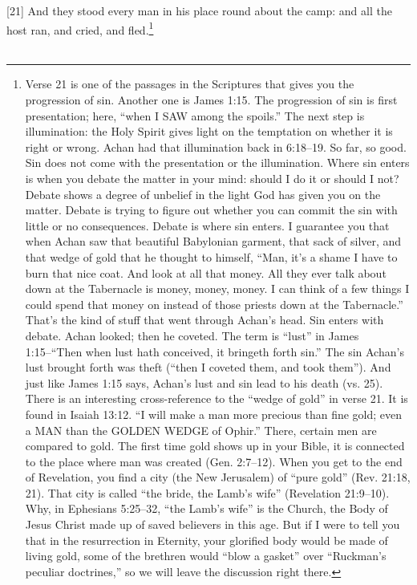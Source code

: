 {[21] \textcolor[rgb]{0.00,0.00,1.00}{And they stood every man in his place round about the camp: and all the host ran, and cried, and fled.}\footnote{Verse 21 is one of the passages in the Scriptures that gives you the progression of sin. Another one is James 1:15. The progression of sin is first presentation; here, “when I SAW among the spoils.” The next step is illumination: the Holy Spirit gives light on the temptation on whether it is right or wrong. Achan had that illumination back in 6:18--19. So far, so good. Sin does not come with the presentation or the illumination. Where sin enters is when you debate the matter in your mind: should I do it or should I not? Debate shows a degree of unbelief in the light God has given you on the matter. Debate is trying to figure out whether you can commit the sin with little or no consequences. Debate is where sin enters. I guarantee you that when Achan saw that beautiful Babylonian garment, that sack of silver, and that wedge of gold that he thought to himself, ``Man, it’s a shame I have to burn that nice coat. And look at all that money. All they ever talk about down at the Tabernacle is money, money, money. I can think of a few things I could spend that money on instead of those priests down at the Tabernacle.'' That’s the kind of stuff that went through Achan’s head. Sin enters with debate. Achan looked; then he coveted. The term is “lust” in James 1:15--“Then when lust hath conceived, it bringeth forth sin.” The sin Achan’s lust brought forth was theft (“then I coveted them, and took them”). And just like James 1:15 says, Achan’s lust and sin lead to his death (vs. 25). There is an interesting cross-reference to the “wedge of gold” in verse 21. It is found in Isaiah 13:12. “I will make a man more precious than fine gold; even a MAN than the GOLDEN WEDGE of Ophir.” There, certain men are compared to gold. The first time gold shows up in your Bible, it is connected to the place where man was created (Gen. 2:7–12). When you get to the end of Revelation, you find a city (the New Jerusalem) of “pure gold” (Rev. 21:18, 21). That city is called “the bride, the Lamb’s wife” (Revelation 21:9–10). Why, in Ephesians 5:25–32, “the Lamb’s wife” is the Church, the Body of Jesus Christ made up of saved believers in this age. But if I were to tell you that in the resurrection in Eternity, your glorified body would be made of living gold, some of the brethren would “blow a gasket” over “Ruckman’s peculiar doctrines,” so we will leave the discussion right there.}\\\
}
